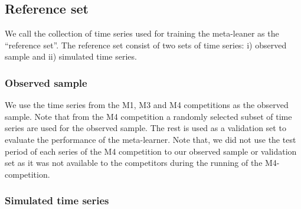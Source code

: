 \documentclass[11pt,a4paper,]{article}
\begin{document}
\hypertarget{reference-set}{%
\subsection{Reference set}\label{reference-set}}

We call the collection of time series used for training the meta-leaner as the ``reference set''. The reference set consist of two sets of time series: i) observed sample and ii) simulated time series.

\hypertarget{observed-sample}{%
\subsubsection{Observed sample}\label{observed-sample}}

We use the time series from the M1, M3 and M4 competitions as the observed sample. Note that from the M4 competition a randomly selected subset of time series are used for the observed sample. The rest is used as a validation set to evaluate the performance of the meta-learner. Note that, we did not use the test period of each series of the M4 competition to our observed sample or validation set as it was not available to the competitors during the running of the M4-competition.

\hypertarget{simulated-time-series}{%
\subsubsection{Simulated time series}\label{simulated-time-series}}
\end{document}
